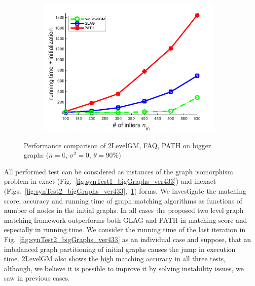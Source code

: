 \begin{figure}[h]
\begin{subfigure}[b]{0.32\textwidth}
			\includegraphics[scale=0.25]{"chapter3/fig/SyntheticTest_BigGraphs/descr/Results_v4.3.3/Test3/time_summary_avg1t"} 
		\end{subfigure} 	
	\caption[Performance comparison of 2LevelGM, FAQ, PATH on bigger graphs: test $3$]{Performance comparison of 2LevelGM, FAQ, PATH on bigger graphs ($\bar{n}=0$, $\sigma^2=0$, $\theta=90\%$)}
	\label{fig:synTest3_bigGraphs_ver433}
\end{figure}

All performed test can be considered as instances of the graph isomorphism problem in exact (Fig.~\ref{fig:synTest1_bigGraphs_ver433}) and inexact (Figs.~\ref{fig:synTest2_bigGraphs_ver433},~\ref{fig:synTest3_bigGraphs_ver433}) forms. We investigate the matching score, accuracy and running time of graph matching algorithms as functions of number of nodes in the initial graphs.
In all cases the proposed two level graph matching framework outperforms both GLAG and PATH in matching score and especially in running time.  We consider the running time of the last iteration in Fig.~\ref{fig:synTest2_bigGraphs_ver433} as an individual case and suppose, that an imbalanced graph partitioning of initial graphs causes the jump in execution time. 2LevelGM also shows the high matching accuracy in all three tests, although, we believe it is possible to improve it by solving instability issues, we saw in previous cases. 
\FloatBarrier

